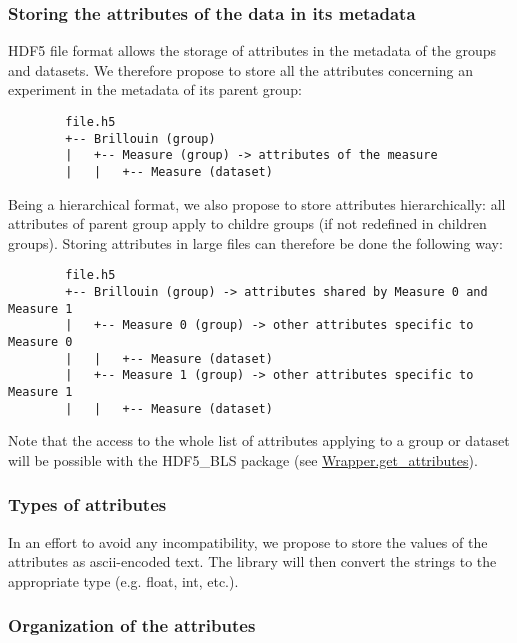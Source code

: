 \subsubsection*{Storing the attributes of the data in its metadata}

    HDF5 file format allows the storage of attributes in the metadata of the groups and datasets. We therefore propose to store all the attributes concerning an experiment in the metadata of its parent group:
    \begin{verbatim}
        file.h5
        +-- Brillouin (group)
        |   +-- Measure (group) -> attributes of the measure
        |   |   +-- Measure (dataset) 
    \end{verbatim}

    Being a hierarchical format, we also propose to store attributes hierarchically: all attributes of parent group apply to childre groups (if not redefined in children groups). Storing attributes in large files can therefore be done the following way:
    \begin{verbatim}
        file.h5
        +-- Brillouin (group) -> attributes shared by Measure 0 and Measure 1
        |   +-- Measure 0 (group) -> other attributes specific to Measure 0
        |   |   +-- Measure (dataset)
        |   +-- Measure 1 (group) -> other attributes specific to Measure 1
        |   |   +-- Measure (dataset)
    \end{verbatim}

    Note that the access to the whole list of attributes applying to a group or dataset will be possible with the HDF5\_BLS package (see \hyperref[subchapter:wrapper.get_attributes]{Wrapper.get\_attributes}).

\subsubsection*{Types of attributes}

    In an effort to avoid any incompatibility, we propose to store the values of the attributes as ascii-encoded text. The library will then convert the strings to the appropriate type (e.g. float, int, etc.).

\subsubsection*{Organization of the attributes}

